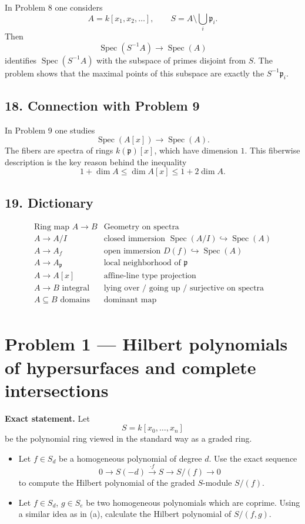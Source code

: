 \documentclass[12pt,a4paper]{article}
\theoremstyle{plain}
\theoremstyle{definition}      %
\begin{document}
In Problem 8 one considers
\[
A=k[x_1,x_2,\dots],\qquad S=A\setminus \bigcup_i \mathfrak p_i.
\]
Then
\[
\operatorname{Spec}(S^{-1}A)\to \operatorname{Spec}(A)
\]
identifies \(\operatorname{Spec}(S^{-1}A)\) with the subspace of primes disjoint from \(S\). The problem shows that the maximal points of this subspace are exactly the \(S^{-1}\mathfrak p_i\).

\subsection*{18. Connection with Problem 9}

In Problem 9 one studies
\[
\operatorname{Spec}(A[x])\to \operatorname{Spec}(A).
\]
The fibers are spectra of rings \(k(\mathfrak p)[x]\), which have dimension \(1\). This fiberwise description is the key reason behind the inequality
\[
1+\dim A\le \dim A[x]\le 1+2\dim A.
\]

\subsection*{19. Dictionary}

\[
\begin{array}{c|c}
	\text{Ring map }A\to B & \text{Geometry on spectra} \\
	\hline
	A\to A/I & \text{closed immersion } \operatorname{Spec}(A/I)\hookrightarrow \operatorname{Spec}(A) \\
	A\to A_f & \text{open immersion } D(f)\hookrightarrow \operatorname{Spec}(A) \\
	A\to A_{\mathfrak p} & \text{local neighborhood of } \mathfrak p \\
	A\to A[x] & \text{affine-line type projection} \\
	A\to B \text{ integral} & \text{lying over / going up / surjective on spectra} \\
	A\subseteq B \text{ domains} & \text{dominant map} \\
\end{array}
\]

	\section*{Problem 1 --- Hilbert polynomials of hypersurfaces and complete intersections}
	
	\textbf{Exact statement.}
	Let
	\[
	S = k[x_0,\dots,x_n]
	\]
	be the polynomial ring viewed in the standard way as a graded ring.
	
	\begin{itemize}
		\item[(a)] Let \(f\in S_d\) be a homogeneous polynomial of degree \(d\). Use the exact sequence
		\[
		0 \longrightarrow S(-d) \xrightarrow{\cdot f} S \longrightarrow S/(f) \longrightarrow 0
		\]
		to compute the Hilbert polynomial of the graded \(S\)-module \(S/(f)\).
		
		\item[(b)] Let \(f\in S_d\), \(g\in S_e\) be two homogeneous polynomials which are coprime. Using a similar idea as in (a), calculate the Hilbert polynomial of \(S/(f,g)\).
	\end{itemize}
	
\end{document}
